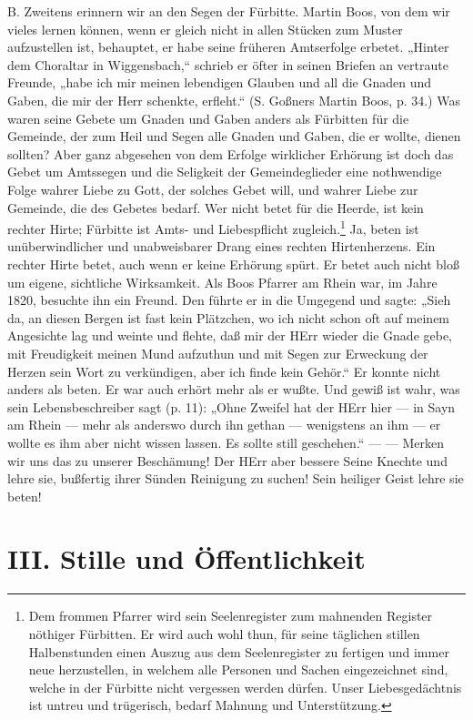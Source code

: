 B. Zweitens erinnern wir an den Segen der Fürbitte. Martin Boos, von dem wir vieles lernen können, wenn er gleich nicht in allen Stücken zum Muster aufzustellen ist, behauptet, er habe seine früheren Amtserfolge erbetet. „Hinter dem Choraltar in Wiggensbach,“ schrieb er öfter in seinen Briefen an vertraute Freunde, „habe ich mir meinen lebendigen Glauben und all die Gnaden und Gaben, die mir der Herr schenkte, erfleht.“ (S. Goßners Martin Boos, p. 34.) Was waren seine Gebete um Gnaden und Gaben anders als Fürbitten für die Gemeinde, der zum Heil und Segen alle Gnaden und Gaben, die er wollte, dienen sollten? Aber ganz abgesehen von dem Erfolge wirklicher Erhörung ist doch das Gebet um Amtssegen und die Seligkeit der Gemeindeglieder eine nothwendige Folge wahrer Liebe zu Gott, der solches Gebet will, und wahrer Liebe zur Gemeinde, die des Gebetes bedarf. Wer nicht betet für die Heerde, ist kein rechter Hirte; Fürbitte ist Amts- und Liebespflicht zugleich.\footnote{Dem frommen Pfarrer wird sein Seelenregister zum mahnenden Register nöthiger Fürbitten. Er wird auch wohl thun, für seine täglichen stillen Halbenstunden einen Auszug aus dem Seelenregister zu fertigen und immer neue herzustellen, in welchem alle Personen und Sachen eingezeichnet sind, welche in der Fürbitte nicht vergessen werden dürfen. Unser Liebesgedächtnis ist untreu und trügerisch, bedarf Mahnung und Unterstützung.} Ja, beten ist unüberwindlicher und unabweisbarer Drang eines rechten Hirtenherzens. Ein rechter Hirte
betet, auch wenn er keine Erhörung spürt. Er betet auch nicht bloß um eigene, sichtliche Wirksamkeit. Als Boos Pfarrer am Rhein war, im Jahre 1820, besuchte ihn ein Freund. Den führte er in die Umgegend und sagte: „Sieh da, an diesen Bergen ist fast kein Plätzchen, wo ich nicht schon oft auf meinem Angesichte lag und weinte und flehte, daß mir der HErr wieder die Gnade gebe, mit Freudigkeit meinen Mund aufzuthun und mit Segen zur Erweckung der Herzen sein Wort zu verkündigen, aber ich finde kein Gehör.“ Er konnte nicht anders als beten. Er war auch erhört mehr als er wußte. Und gewiß ist wahr, was sein Lebensbeschreiber sagt (p. 11): „Ohne Zweifel hat der HErr hier — in Sayn am Rhein — mehr als anderswo durch ihn gethan — wenigstens an ihm — er wollte es ihm aber nicht wissen lassen. Es sollte still geschehen.“ — — Merken wir uns das zu unserer Beschämung! Der HErr aber bessere Seine Knechte und lehre sie, bußfertig ihrer Sünden Reinigung zu suchen! Sein heiliger Geist lehre sie beten!

\section{III. Stille und Öffentlichkeit}

